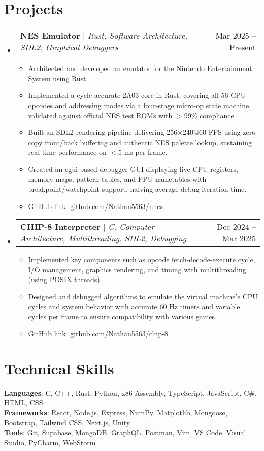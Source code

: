 \documentclass[letterpaper,11pt]{article}
\makeatletter
\newcommand{\resumeItem}[1]{
  \item\small{
    {#1 \vspace{-2pt}}
  }
}
\newcommand{\resumeProjectHeading}[2]{
    \item
    \begin{tabular*}{0.97\textwidth}{l@{\extracolsep{\fill}}r}
      \small#1 & #2 \\
    \end{tabular*}\vspace{-7pt}
}
\newcommand{\resumeSubHeadingListStart}{\begin{itemize}[leftmargin=0.15in, label={}]}
\newcommand{\resumeSubHeadingListEnd}{\end{itemize}}
\newcommand{\resumeItemListStart}{\begin{itemize}}
\newcommand{\resumeItemListEnd}{\end{itemize}\vspace{-5pt}}
\makeatother
\begin{document}
\section{Projects}
    \resumeSubHeadingListStart
        \resumeProjectHeading
          {\textbf{NES Emulator} $|$ \emph{Rust, Software Architecture, SDL2, Graphical Debuggers}}{Mar 2025 -- Present}
          \resumeItemListStart
            \resumeItem{Architected and developed an emulator for the Nintendo Entertainment System using Rust.}
            \resumeItem{Implemented a cycle-accurate 2A03 core in Rust, covering all 56 CPU opcodes and addressing modes via a four-stage micro-op state machine, validated against official NES test ROMs with $>$99\% compliance.}
            \resumeItem{Built an SDL2 rendering pipeline delivering 256$\times$240@60 FPS using zero-copy front/back buffering and authentic NES palette lookup, sustaining real-time performance on $<$5 ms per frame.}
            \resumeItem{Created an egui-based debugger GUI displaying live CPU registers, memory maps, pattern tables, and PPU nametables with breakpoint/watchpoint support, halving average debug iteration time.}
            \resumeItem{GitHub link: \href{https://github.com/Nathan5563/nnes}{github.com/Nathan5563/nnes}}
          \resumeItemListEnd
      \resumeProjectHeading
          {\textbf{CHIP-8 Interpreter} $|$ \emph{C, Computer Architecture, Multithreading, SDL2, Debugging}}{Dec 2024 -- Mar 2025}
          \resumeItemListStart
            \resumeItem{Implemented key components such as opcode fetch-decode-execute cycle, I/O management, graphics rendering, and timing with multithreading (using POSIX threads).}
            \resumeItem{Designed and debugged algorithms to emulate the virtual machine's CPU cycles and system behavior with accurate 60 Hz timers and variable cycles per frame to ensure compatibility with various games.}
            \resumeItem{GitHub link: \href{https://github.com/Nathan5563/chip-8}{github.com/Nathan5563/chip-8}}
          \resumeItemListEnd
    \resumeSubHeadingListEnd

\section{Technical Skills}
 \begin{itemize}[leftmargin=0.15in, label={}]
    \small{\item{
     \textbf{Languages}{: C, C++, Rust, Python, x86 Assembly, TypeScript, JavaScript, C\#, HTML, CSS} \\
     \textbf{Frameworks}{: React, Node.js, Express, NumPy, Matplotlib, Mongoose, Bootstrap, Tailwind CSS, Next.js, Unity} \\
     \textbf{Tools}{: Git, Supabase, MongoDB, GraphQL, Postman, Vim, VS Code, Visual Studio, PyCharm, WebStorm} \\
    }}
 \end{itemize}
\end{document}
